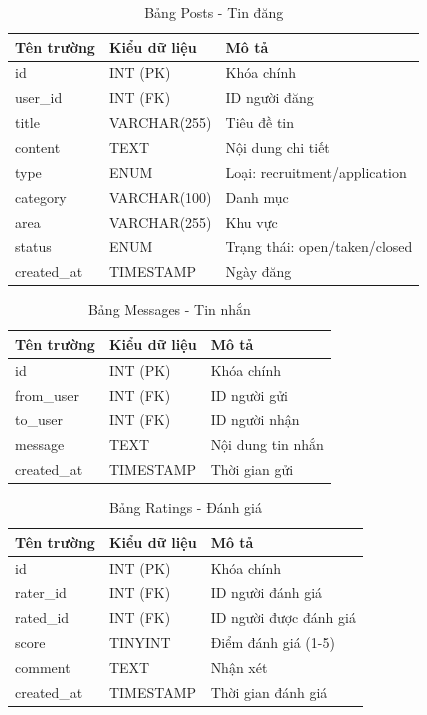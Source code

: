 \documentclass[12pt,a4paper]{report}
\begin{document}
\begin{table}[H]
\centering
\caption{Bảng Posts - Tin đăng}
\begin{tabular}{|l|l|l|}
\hline
\textbf{Tên trường} & \textbf{Kiểu dữ liệu} & \textbf{Mô tả} \\
\hline
id & INT (PK) & Khóa chính \\
user\_id & INT (FK) & ID người đăng \\
title & VARCHAR(255) & Tiêu đề tin \\
content & TEXT & Nội dung chi tiết \\
type & ENUM & Loại: recruitment/application \\
category & VARCHAR(100) & Danh mục \\
area & VARCHAR(255) & Khu vực \\
status & ENUM & Trạng thái: open/taken/closed \\
created\_at & TIMESTAMP & Ngày đăng \\
\hline
\end{tabular}
\end{table}

\begin{table}[H]
\centering
\caption{Bảng Messages - Tin nhắn}
\begin{tabular}{|l|l|l|}
\hline
\textbf{Tên trường} & \textbf{Kiểu dữ liệu} & \textbf{Mô tả} \\
\hline
id & INT (PK) & Khóa chính \\
from\_user & INT (FK) & ID người gửi \\
to\_user & INT (FK) & ID người nhận \\
message & TEXT & Nội dung tin nhắn \\
created\_at & TIMESTAMP & Thời gian gửi \\
\hline
\end{tabular}
\end{table}

\begin{table}[H]
\centering
\caption{Bảng Ratings - Đánh giá}
\begin{tabular}{|l|l|l|}
\hline
\textbf{Tên trường} & \textbf{Kiểu dữ liệu} & \textbf{Mô tả} \\
\hline
id & INT (PK) & Khóa chính \\
rater\_id & INT (FK) & ID người đánh giá \\
rated\_id & INT (FK) & ID người được đánh giá \\
score & TINYINT & Điểm đánh giá (1-5) \\
comment & TEXT & Nhận xét \\
created\_at & TIMESTAMP & Thời gian đánh giá \\
\hline
\end{tabular}
\end{table}
\end{document}
